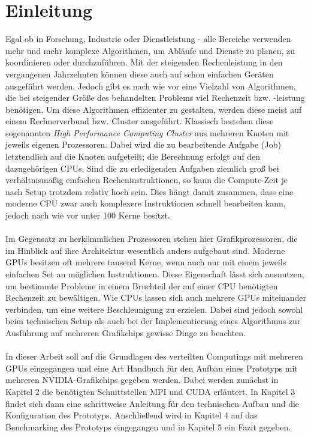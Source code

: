 \documentclass[doktyp=semarbeit, sprache=german]{TUBAFarbeiten}
\begin{document}
\maketitle
\tableofcontents
\TUBAFErklaerungsseite
\newpage
\section{Einleitung}
Egal ob in Forschung, Industrie oder Dienstleistung - alle Bereiche verwenden mehr und mehr komplexe Algorithmen, um Abläufe und Dienste zu planen, zu koordinieren oder durchzuführen. Mit der steigenden Rechenleistung in den vergangenen Jahrzehnten können diese auch auf schon einfachen Geräten ausgeführt werden. Jedoch gibt es nach wie vor eine Vielzahl von Algorithmen, die bei steigender Größe des behandelten Problems viel Rechenzeit bzw. -leistung benötigen. Um diese Algorithmen effizienter zu gestalten, werden diese meist auf einem Rechnerverbund bzw. Cluster ausgeführt. Klassisch bestehen diese sogenannten \textit{High Performance Computing Cluster} aus mehreren Knoten mit jeweils eigenen Prozessoren. Dabei wird die zu bearbeitende Aufgabe (Job) letztendlich auf die Knoten aufgeteilt; die Berechnung erfolgt auf den dazugehörigen CPUs. Sind die zu erledigenden Aufgaben ziemlich groß bei verhältnismäßig einfachen Recheninstruktionen, so kann die Compute-Zeit je nach Setup trotzdem relativ hoch sein. Dies hängt damit zusammen, dass eine moderne CPU zwar auch komplexere Instruktionen schnell bearbeiten kann, jedoch nach wie vor unter 100 Kerne besitzt.
\\\\Im Gegensatz zu herkömmlichen Prozessoren stehen hier Grafikprozessoren, die im Hinblick auf ihre Architektur wesentlich anders aufgebaut sind. Moderne GPUs besitzen oft mehrere tausend Kerne, wenn auch nur mit einem jeweils einfachen Set an möglichen Instruktionen. Diese Eigenschaft lässt sich ausnutzen, um bestimmte Probleme in einem Bruchteil der auf einer CPU benötigten Rechenzeit zu bewältigen. Wie CPUs lassen sich auch mehrere GPUs miteinander verbinden, um eine weitere Beschleunigung zu erzielen. Dabei sind jedoch sowohl beim technischen Setup als auch bei der Implementierung eines Algorithmus zur Ausführung auf mehreren Grafikchips gewisse Dinge zu beachten.
\\\\In dieser Arbeit soll auf die Grundlagen des verteilten Computings mit mehreren GPUs eingegangen und eine Art Handbuch für den Aufbau eines Prototyps mit mehreren NVIDIA-Grafikchips gegeben werden. Dabei werden zunächst in Kapitel 2 die benötigten Schnittstellen MPI und CUDA erläutert. In Kapitel 3 findet sich dann eine schrittweise Anleitung für den technischen Aufbau und die Konfiguration des Prototyps. Anschließend wird in Kapitel 4 auf das Benchmarking des Prototyps eingegangen und in Kapitel 5 ein Fazit gegeben.
\newpage
\end{document}
